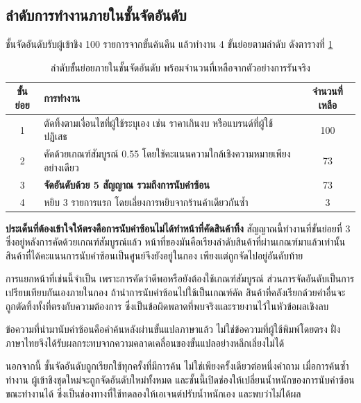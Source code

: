 
\subsection{ลำดับการทำงานภายในชั้นจัดอันดับ}

ชั้นจัดอันดับรับผู้เข้าชิง 100 รายการจากขั้นค้นคืน แล้วทำงาน 4 ขั้นย่อยตามลำดับ
ดังตารางที่ \ref{tab:rankorder}

\begin{table}[H]
\centering
\caption{ลำดับขั้นย่อยภายในชั้นจัดอันดับ พร้อมจำนวนที่เหลือจากตัวอย่างการรันจริง}
\label{tab:rankorder}
\small
\begin{tabular}{|c|p{7.2cm}|c|}
\hline
\textbf{ขั้นย่อย} & \textbf{การทำงาน} & \textbf{จำนวนที่เหลือ} \\
\hline
1 & ตัดทิ้งตามเงื่อนไขที่ผู้ใช้ระบุเอง เช่น ราคาเกินงบ หรือแบรนด์ที่ผู้ใช้ปฏิเสธ & 100 \\ \hline
2 & คัดด้วยเกณฑ์สัมบูรณ์ 0.55 โดยใช้คะแนนความใกล้เชิงความหมายเพียงอย่างเดียว & 73 \\ \hline
3 & \textbf{จัดอันดับด้วย 5 สัญญาณ รวมถึงการนับคำซ้อน} & 73 \\ \hline
4 & หยิบ 3 รายการแรก โดยเลี่ยงการหยิบจากร้านค้าเดียวกันซ้ำ & 3 \\
\hline
\end{tabular}
\end{table}

\textbf{ประเด็นที่ต้องเข้าใจให้ตรงคือการนับคำซ้อนไม่ได้ทำหน้าที่คัดสินค้าทิ้ง}
สัญญาณนี้ทำงานที่ขั้นย่อยที่ 3 ซึ่งอยู่หลังการคัดด้วยเกณฑ์สัมบูรณ์แล้ว
หน้าที่ของมันคือเรียงลำดับสินค้าที่ผ่านเกณฑ์มาแล้วเท่านั้น
สินค้าที่ได้คะแนนการนับคำซ้อนเป็นศูนย์จึงยังอยู่ในกอง เพียงแต่ถูกจัดไปอยู่อันดับท้าย

การแยกหน้าที่เช่นนี้จำเป็น เพราะการคัดว่าดีพอหรือยังต้องใช้เกณฑ์สัมบูรณ์
ส่วนการจัดอันดับเป็นการเปรียบเทียบกันเองภายในกอง ถ้านำการนับคำซ้อนไปใช้เป็นเกณฑ์คัด
สินค้าที่คลังเรียกด้วยคำอื่นจะถูกตัดทิ้งทั้งที่ตรงกับความต้องการ
ซึ่งเป็นข้อผิดพลาดที่พบจริงและรายงานไว้ในหัวข้อผลเชิงลบ

ข้อความที่นำมานับคำซ้อนคือคำค้นหลังผ่านขั้นแปลภาษาแล้ว ไม่ใช่ข้อความที่ผู้ใช้พิมพ์โดยตรง
ฝั่งภาษาไทยจึงได้รับผลกระทบจากความคลาดเคลื่อนของขั้นแปลอย่างหลีกเลี่ยงไม่ได้

นอกจากนี้ ชั้นจัดอันดับถูกเรียกใช้ทุกครั้งที่มีการค้น ไม่ใช่เพียงครั้งเดียวต่อหนึ่งคำถาม
เมื่อการค้นซ้ำทำงาน ผู้เข้าชิงชุดใหม่จะถูกจัดอันดับใหม่ทั้งหมด
และชั้นนี้เปิดช่องให้เปลี่ยนน้ำหนักของการนับคำซ้อนขณะทำงานได้
ซึ่งเป็นช่องทางที่ใช้ทดลองให้เอเจนต์ปรับน้ำหนักเอง และพบว่าไม่ได้ผล
